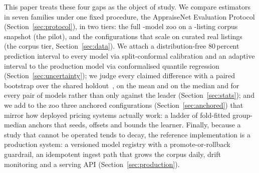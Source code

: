 \documentclass[journal,10pt]{IEEEtran}
\begin{document}
This paper treats these four gaps as the object of study. We compare estimators in seven families under one fixed procedure, the AppraiseNet Evaluation Protocol (Section~\ref{sec:protocol}), in two tiers: the full \PilotNModels{}-model zoo on a \PilotRows{}-listing corpus snapshot (the pilot), and the \NModels{} configurations that scale on \NRows{} curated real listings (the corpus tier, Section~\ref{sec:data}). We attach a distribution-free 80\,percent prediction interval to every model via split-conformal calibration and an adaptive interval to the production model via conformalised quantile regression~\cite{vovk2005,lei2018,romano2019} (Section~\ref{sec:uncertainty}); we judge every claimed difference with a paired bootstrap over the shared holdout~\cite{efron1979}, on the mean and on the median and for every pair of models rather than only against the leader (Section~\ref{sec:stats}); and we add to the zoo three anchored configurations (Section~\ref{sec:anchored}) that mirror how deployed pricing systems actually work: a ladder of fold-fitted group-median anchors that seeds, offsets and bounds the learner. Finally, because a study that cannot be operated tends to decay, the reference implementation is a production system: a versioned model registry with a promote-or-rollback guardrail, an idempotent ingest path that grows the corpus daily, drift monitoring and a serving API (Section~\ref{sec:production}).
\end{document}
